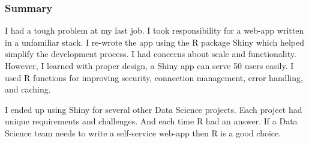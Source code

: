\documentclass[]{article}
\newenvironment{Shaded}{\begin{snugshade}}{\end{snugshade}}
\newcommand{\ControlFlowTok}[1]{\textcolor[rgb]{0.13,0.29,0.53}{\textbf{#1}}}
\newcommand{\DataTypeTok}[1]{\textcolor[rgb]{0.13,0.29,0.53}{#1}}
\newcommand{\KeywordTok}[1]{\textcolor[rgb]{0.13,0.29,0.53}{\textbf{#1}}}
\newcommand{\NormalTok}[1]{#1}
\newcommand{\OperatorTok}[1]{\textcolor[rgb]{0.81,0.36,0.00}{\textbf{#1}}}
\newcommand{\StringTok}[1]{\textcolor[rgb]{0.31,0.60,0.02}{#1}}
\begin{document}
\begin{Shaded}
\end{Shaded}

\hypertarget{summary}{%
\subsubsection{Summary}\label{summary}}

I had a tough problem at my last job. I took responsibility for a
web-app written in a unfamiliar stack. I re-wrote the app using the R
package Shiny which helped simplify the development process. I had
concerns about scale and functionality. However, I learned with proper
design, a Shiny app can serve 50 users easily. I used R functions for
improving security, connection management, error handling, and caching.

I ended up using Shiny for several other Data Science projects. Each
project had unique requirements and challenges. And each time R had an
answer. If a Data Science team needs to write a self-service web-app
then R is a good choice.
\end{document}
